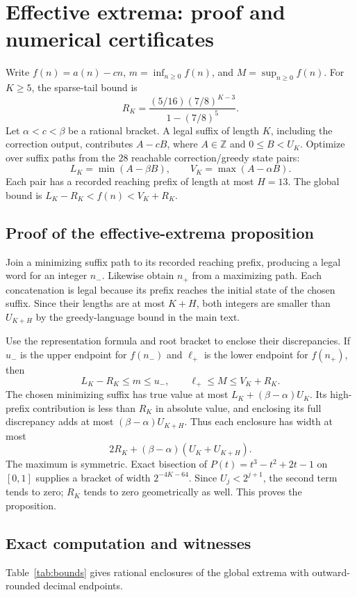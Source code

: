 \section{Effective extrema: proof and numerical certificates}
Write $f(n)=a(n)-cn$, $m=\inf_{n\ge0}f(n)$, and
$M=\sup_{n\ge0}f(n)$. For $K\ge5$, the sparse-tail bound is
\[
 R_K=\frac{(5/16)(7/8)^{K-3}}{1-(7/8)^5}.
\]
Let $\alpha<c<\beta$ be a rational bracket. A legal suffix of length $K$,
including the correction output, contributes $A-cB$, where
$A\in\mathbb Z$ and $0\le B<U_K$. Optimize over suffix paths from the
$28$ reachable correction/greedy state pairs:
\[
 L_K=\min(A-\beta B),\qquad V_K=\max(A-\alpha B).
\]
Each pair has a recorded reaching prefix of length at most $H=13$.
The global bound is $L_K-R_K<f(n)<V_K+R_K$.

\subsection{Proof of the effective-extrema proposition}
Join a minimizing suffix path to its recorded reaching prefix, producing
a legal word for an integer $n_-$. Likewise obtain $n_+$ from a maximizing
path. Each concatenation is legal because its prefix reaches the initial
state of the chosen suffix. Since their lengths are at most $K+H$, both integers
are smaller than $U_{K+H}$ by the greedy-language bound in the main text.

Use the representation formula and root bracket to enclose their
discrepancies. If $u_-$ is the upper endpoint for $f(n_-)$ and $\ell_+$
is the lower endpoint for $f(n_+)$, then
\begin{equation}
 L_K-R_K\le m\le u_-,\qquad
 \ell_+\le M\le V_K+R_K.
\end{equation}
The chosen minimizing suffix has true value at most
$L_K+(\beta-\alpha)U_K$. Its high-prefix contribution is less than $R_K$
in absolute value, and enclosing its full discrepancy adds at most
$(\beta-\alpha)U_{K+H}$. Thus each enclosure has width at most
\begin{equation}
 2R_K+(\beta-\alpha)(U_K+U_{K+H}).
\end{equation}
The maximum is symmetric. Exact bisection of
$P(t)=t^3-t^2+2t-1$ on $[0,1]$ supplies a bracket of width
$2^{-4K-64}$. Since $U_j<2^{j+1}$, the second term tends to zero;
$R_K$ tends to zero geometrically as well. This proves the proposition.

\subsection{Exact computation and witnesses}
Table~\ref{tab:bounds} gives rational enclosures of the global extrema
with outward-rounded decimal endpoints.
\begin{table}[htbp]
\centering\small

\caption{Global discrepancy bounds. The last column bounds the larger
exact extrema-enclosure width, rounded upwards.}
\label{tab:bounds}
\end{table}

